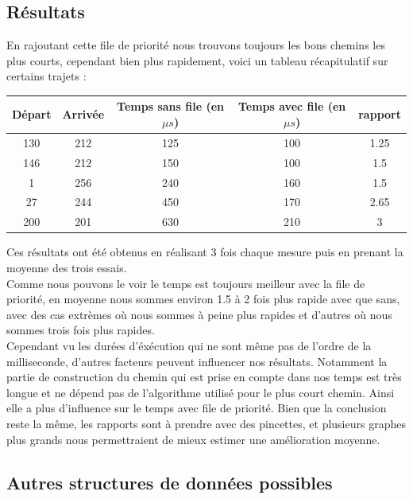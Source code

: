 \documentclass{article}
\begin{document}
\subsection{Résultats}

En rajoutant cette file de priorité nous trouvons toujours les bons chemins les plus courts, cependant
bien plus rapidement, voici un tableau récapitulatif sur certains trajets :\\

\begin{center}
\begin{tabular}{| c | c | c | c | c |}
	\hline
	 Départ & Arrivée & Temps sans file (en $\mu s$)& Temps avec file (en $\mu s$) & rapport \\ \hline
	 130 & 212 & 125 & 100 & 1.25 \\ \hline
	 146 & 212 & 150 & 100 & 1.5 \\ \hline
	 1 & 256 & 240 & 160 & 1.5\\ \hline
	 27 & 244 & 450 & 170 & 2.65\\ \hline
	 200 & 201 & 630 & 210 & 3 \\ \hline
\end{tabular}
\end{center}

Ces résultats ont été obtenus en réalisant 3 fois chaque mesure puis en prenant la moyenne des
trois essais.\\

Comme nous pouvons le voir le temps est toujours meilleur avec la file de priorité, en moyenne nous
sommes environ 1.5 à 2 fois plus rapide avec que sans, avec des cas extrèmes où nous sommes à peine plus
rapides et d'autres où nous sommes trois fois plus rapides.\\

Cependant vu les durées d'éxécution qui ne sont même pas de l'ordre de la milliseconde, d'autres facteurs
peuvent influencer nos résultats. Notamment la partie de construction du chemin qui est prise en compte
dans nos temps est très longue et ne dépend pas de l'algorithme utilisé pour le plus court chemin.
Ainsi elle a plus d'influence sur le temps avec file de priorité. Bien que la conclusion reste la même, les rapports 
sont à prendre avec des pincettes, et plusieurs graphes plus grands nous permettraient de mieux estimer une amélioration
moyenne.

\subsection{Autres structures de données possibles}
\end{document}
